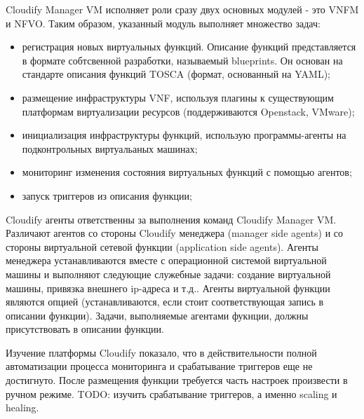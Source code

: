 \documentclass[oneside,final,14pt,a4paper]{extreport}
\begin{document}
Cloudify Manager VM исполняет роли сразу двух основных модулей - это VNFM и NFVO. Таким образом, указанный модуль выполняет множество задач:
\begin{itemize}
	\item регистрация новых виртуальных функций. Описание функций представляется в формате собтсвенной разработки, называемый blueprints. Он основан на стандарте описания функций TOSCA (формат, основанный на YAML);
	\item размещение инфраструктуры VNF, используя плагины к существующим платформам виртуализации ресурсов (поддерживаются Openstack, VMware);
	\item инициализация инфраструктуры функций, использую программы-агенты на подконтрольных виртуальаных машинах;
	\item мониторинг изменения состояния виртуальных функций с помощью агентов;
	\item запуск триггеров из описания функции;
\end{itemize}

Cloudify агенты ответственны за выполнения команд Cloudify Manager VM. Различают агентов со стороны Cloudify менеджера (manager side agents) и со стороны виртуальной сетевой функции (application side agents). Агенты менеджера устанавливаются вместе с операционной системой виртуальной машины и выполняют следующие служебные задачи: создание виртуальной машины, привязка внешнего ip-адреса и т.д.. Агенты виртуальной функции являются опцией (устанавливаются, если стоит соответствующая запись в описании функции). Задачи, выполняемые агентами фукнции, должны присутствовать в описании функции.\cite{cloudify-official-oveview1}

Изучение платформы Cloudify показало, что в действительности полной автоматизации процесса мониторинга и срабатывание триггеров еще не достигнуто. После размещения функции требуется часть настроек произвести в ручном режиме. 
TODO: изучить срабатывание триггеров, а именно scaling и healing.
\end{document}
